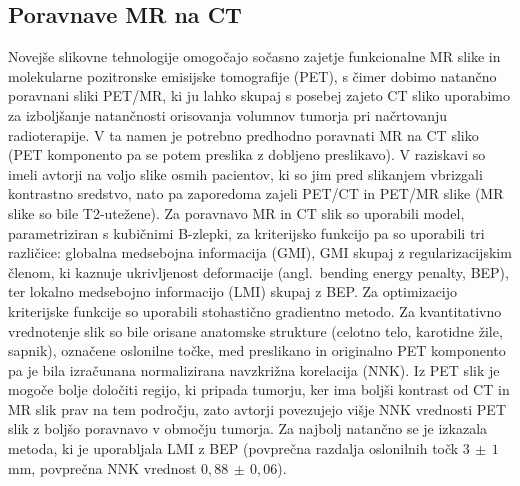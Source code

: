 \documentclass[journal]{IEEEtran}
\begin{document}
\subsection{Poravnave MR na CT}

Novejše slikovne tehnologije omogočajo sočasno zajetje funkcionalne MR slike in molekularne pozitronske emisijske tomografije (PET), s čimer dobimo natančno poravnani sliki PET/MR, ki ju lahko skupaj s posebej zajeto CT sliko uporabimo za izboljšanje natančnosti orisovanja volumnov tumorja pri načrtovanju radioterapije. V ta namen je potrebno predhodno poravnati MR na CT sliko (PET komponento pa se potem preslika z dobljeno preslikavo). V raziskavi \cite{leibfarth2013} so imeli avtorji na voljo slike osmih pacientov, ki so jim pred slikanjem vbrizgali kontrastno sredstvo, nato pa zaporedoma zajeli PET/CT in PET/MR slike (MR slike so bile T2-utežene). Za poravnavo MR in CT slik so uporabili model, parametriziran s kubičnimi B-zlepki, za kriterijsko funkcijo pa so uporabili tri različice: globalna medsebojna informacija (GMI), GMI skupaj z regularizacijskim členom, ki kaznuje ukrivljenost deformacije (angl.~bending energy penalty, BEP), ter lokalno medsebojno informacijo (LMI) skupaj z BEP. Za optimizacijo kriterijske funkcije so uporabili stohastično gradientno metodo. Za kvantitativno vrednotenje slik so bile orisane anatomske strukture (celotno telo, karotidne žile, sapnik), označene oslonilne točke, med preslikano in originalno PET komponento pa je bila izračunana normalizirana navzkrižna korelacija (NNK). Iz PET slik je mogoče bolje določiti regijo, ki pripada tumorju, ker ima boljši kontrast od CT in MR slik prav na tem področju, zato avtorji povezujejo višje NNK vrednosti PET slik z boljšo poravnavo v območju tumorja. Za najbolj natančno se je izkazala metoda, ki je uporabljala LMI z BEP (povprečna razdalja oslonilnih točk $3\,\pm\,1$ mm, povprečna NNK vrednost $0{,}88\,\pm\,0{,}06$).
\end{document}
